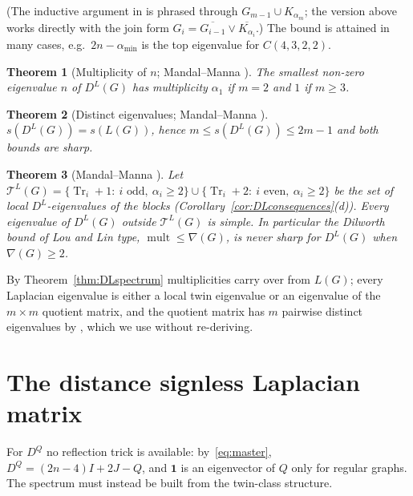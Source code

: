 \documentclass[11pt]{article}
\theoremstyle{plain}
\newtheorem{theorem}{Theorem}[section]
\theoremstyle{definition}
\theoremstyle{remark}
\DeclareMathOperator{\Tr}{Tr}
\begin{document}
	(The inductive argument in \cite{MandalManna2026DLDQ} is phrased through $G_{m-1}\cup K_{\alpha_m}$; the version above works directly with the join form $G_i=\overline{G_{i-1}}\vee\overline{K_{\alpha_i}}$.) The bound is attained in many cases, e.g.\ $2n-\alpha_{\min}$ is the top eigenvalue for $C(4,3,2,2)$.
	
	\begin{theorem}[Multiplicity of $n$; Mandal--Manna \cite{MandalManna2026DLDQ}]
		\label{thm:CDLn}
		The smallest non-zero eigenvalue $n$ of $D^L(G)$ has multiplicity $\alpha_1$ if $m=2$ and $1$ if $m\ge3$.
	\end{theorem}
	
	\begin{theorem}[Distinct eigenvalues; Mandal--Manna \cite{MandalManna2026DLDQ}]
		\label{thm:CDLdistinct}
		$s(D^L(G))=s(L(G))$, hence $m\le s(D^L(G))\le2m-1$ and both bounds are sharp.
	\end{theorem}
	
	
	\begin{theorem}[Mandal--Manna \cite{MandalManna2026DLDQ}]
		\label{thm:CDLsimple}
		Let $\mathcal T^L(G)=\{\Tr_i+1:\ i\text{ odd},\ \alpha_i\ge2\}\cup\{\Tr_i+2:\ i\text{ even},\ \alpha_i\ge2\}$ be the set of local $D^L$-eigenvalues of the blocks (Corollary~\ref{cor:DLconsequences}(d)). Every eigenvalue of $D^L(G)$ outside $\mathcal T^L(G)$ is simple. In particular the Dilworth bound of Lou and Lin type, $\operatorname{mult}\le\nabla(G)$, is never sharp for $D^L(G)$ when $\nabla(G)\ge2$.
	\end{theorem}
	By Theorem~\ref{thm:DLspectrum} multiplicities carry over from $L(G)$; every Laplacian eigenvalue is either a local twin eigenvalue or an eigenvalue of the $m\times m$ quotient matrix, and the quotient matrix has $m$ pairwise distinct eigenvalues by \cite{MandalMehatariStanic2024}, which we use without re-deriving.
	
	\section{The distance signless Laplacian matrix}
	\label{sec:dq}
	
	For $D^Q$ no reflection trick is available: by~\eqref{eq:master}, $D^Q=(2n-4)I+2J-Q$, and $\mathbf1$ is an eigenvector of $Q$ only for regular graphs. The spectrum must instead be built from the twin-class structure.
	
\end{document}
